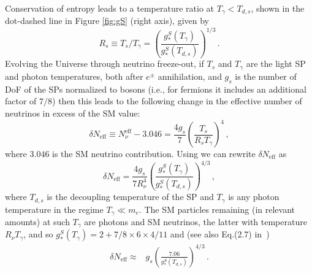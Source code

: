 Conservation of entropy leads to a temperature ratio at $T_\gamma<T_{d,s}$, shown in the dot-dashed line in Figure \ref{fig:gS} (right axis), given by
\begin{equation}\label{eq:TRatio}
R_s\equiv T_{s}/T_{\gamma}=\left(\frac{g_*^S(T_\gamma)}{g_*^S(T_{d,s})}\right)^{1/3}\,.
\end{equation}
Evolving the Universe through neutrino freeze-out, if $T_s$ and $T_\gamma$ are the light SP and photon temperatures, both after $e^\pm$ annihilation, and $g_s$ is the number of DoF of the SPs normalized to bosons (i.e., for fermions it includes an additional factor of $7/8$) then this leads to the following change in the effective number of neutrinos in excess of the SM value:
\begin{equation}\label{Neff1}
\delta N_{\text{eff}}\equiv N^{\text{eff}}_{\nu}-3.046=\frac{4g_s}{7}\left(\frac{T_s}{R_s T_{\gamma}}\right)^4\,,
\end{equation}
where $3.046$ is the SM neutrino contribution. Using  we can rewrite $\delta N_{\text{eff}}$ as
\begin{equation}\label{eq:deltaN}
\delta N_{\text{eff}}=\frac{4g_s}{7R_\nu^4}\left(\frac{g_*^S(T_{\gamma})}{g_*^S(T_{d,s})}\right)^{4/3}\,,
\end{equation}
where $T_{d,s}$ is the decoupling temperature of the SP and $T_{\gamma}$ is any photon temperature in the regime $T_{\gamma}\ll m_e$. The SM particles remaining (in relevant amounts) at such $T_{\gamma}$ are photons and SM neutrinos, the latter with temperature $R_\nu T_{\gamma}$, and so $g_*^S(T_{\gamma})=2+7/8\times 6\times 4/11$ and (see also Eq.(2.7) in~\cite{Blennow:2012de})
\begin{align}\label{eq:deltaN2}
\delta N_{\text{eff}}\approx&g_s\left(\frac{7.06}{g_*^S(T_{d,s})}\right)^{4/3}\,.
\end{align}

